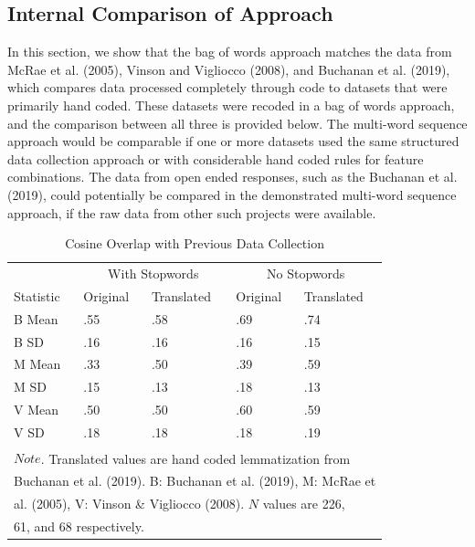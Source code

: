 \documentclass[man]{apa6}
\begin{document}
\hypertarget{internal-comparison-of-approach}{%
\subsection{Internal Comparison of Approach}\label{internal-comparison-of-approach}}

In this section, we show that the bag of words approach matches the data from McRae et al. (2005), Vinson and Vigliocco (2008), and Buchanan et al. (2019), which compares data processed completely through code to datasets that were primarily hand coded. These datasets were recoded in a bag of words approach, and the comparison between all three is provided below. The multi-word sequence approach would be comparable if one or more datasets used the same structured data collection approach or with considerable hand coded rules for feature combinations. The data from open ended responses, such as the Buchanan et al. (2019), could potentially be compared in the demonstrated multi-word sequence approach, if the raw data from other such projects were available.

\begin{table}[t]

\caption{\label{tab:tab7}Cosine Overlap with Previous Data Collection}
\centering
\begin{tabular}{lllll}
\toprule
\multicolumn{1}{c}{ } & \multicolumn{2}{c}{With Stopwords} & \multicolumn{2}{c}{No Stopwords} \\
\cmidrule(l{3pt}r{3pt}){2-3} \cmidrule(l{3pt}r{3pt}){4-5}
Statistic & Original & Translated & Original & Translated\\
\midrule
B Mean & .55 & .58 & .69 & .74\\
B SD & .16 & .16 & .16 & .15\\
M Mean & .33 & .50 & .39 & .59\\
M SD & .15 & .13 & .18 & .13\\
V Mean & .50 & .50 & .60 & .59\\
\addlinespace
V SD & .18 & .18 & .18 & .19\\
\bottomrule
\multicolumn{5}{l}{\textsuperscript{} $Note$. Translated values are hand coded lemmatization from}\\
\multicolumn{5}{l}{Buchanan et al. (2019). B: Buchanan et al. (2019), M: McRae et}\\
\multicolumn{5}{l}{al. (2005), V: Vinson \& Vigliocco (2008). $N$ values are 226,}\\
\multicolumn{5}{l}{61, and 68 respectively.}\\
\end{tabular}
\end{table}
\end{document}
